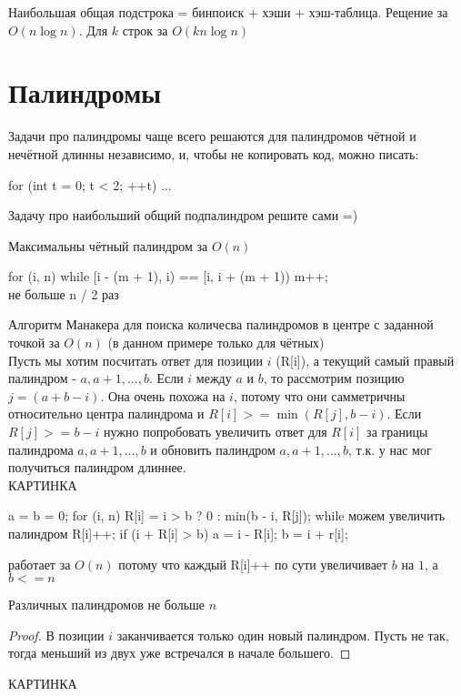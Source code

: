 \begin{Rem}
Наибольшая общая подстрока = бинпоиск + хэши + хэш-таблица. Рещение за $O(n \log n)$. Для $k$ строк за  $O(kn \log n)$
\end{Rem}
\chapter{Палиндромы}
Задачи про палиндромы чаще всего решаются для палиндромов чётной и нечётной длинны независимо, и, чтобы не копировать код, можно писать:
\begin{cppcode}
for (int t = 0; t < 2; ++t) {
	...
}
\end{cppcode}

Задачу про наибольший общий подпалиндром решите сами =)

Максимальны чётный палиндром за $O(n)$
\begin{cppcode}
for (i, n) {
	while [i - (m + 1), i) == [i, i + (m + 1)) {
		m++; \\ не больше n / 2 раз
	}
}
\end{cppcode}
Алгоритм Манакера для поиска количесва палиндромов в центре с заданной точкой за $O(n)$ (в данном примере только для чётных)\\
Пусть мы хотим посчитать ответ для позиции $i$ (R[i]), а текущий самый правый палиндром - $a, a + 1, ..., b$. Если $i$ между $a$ и $b$, то рассмотрим позицию $j = (a + b - i)$. Она очень похожа на $i$, потому что они самметричны относительно центра палиндрома и $R[i] >= \min(R[j], b - i)$. Если $R[j] >= b - i$ нужно попробовать увеличить ответ для $R[i]$  за границы палиндрома $a, a + 1, ...,  b$ и обновить палиндром $a, a + 1, ...,  b$, т.к. у нас мог получиться палиндром длиннее.
\\
КАРТИНКА
\begin{cppcode}
a = b = 0;
for (i, n) {
	R[i] = i > b ? 0 : min(b - i, R[j]);
	while можем увеличить палиндром {
		R[i]++;
	}
	if (i + R[i] > b) {
		a = i - R[i];
		b = i + r[i];
	}
}
\end{cppcode}
работает за $O(n)$ потому что каждый R[i]++ по сути увеличивает $b$ на $1$, а $b <= n$

\begin{theorem}
Различных палиндромов не больше $n$
\end{theorem}
\begin{proof}
В позиции $i$ заканчивается только один новый палиндром. Пусть не так, тогда меньший из двух уже встречался в начале большего. 
\end{proof}
КАРТИНКА

